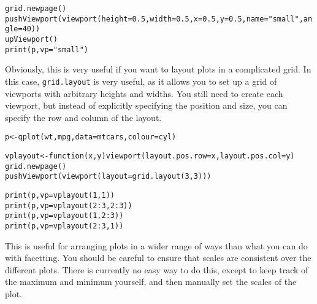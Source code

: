 \begin{alltt}
grid.newpage()
pushViewport(viewport(height=0.5, width=0.5, x=0.5, y=0.5, name="small", angle=40))
upViewport()
print(p, vp="small")
\end{alltt}

Obviously, this is very useful if you want to layout plots in a complicated grid.  In this case, {\tt grid.layout} is very useful, as it allows you to set up a grid of viewports with arbitrary heights and widths.  You still need to create each viewport, but instead of explicitly specifying the position and size, you can specify the row and column of the layout.

\begin{alltt}
p <- qplot(wt, mpg, data=mtcars, colour=cyl)

vplayout <- function(x, y) viewport(layout.pos.row=x, layout.pos.col=y)
grid.newpage()
pushViewport(viewport(layout=grid.layout(3,3)))

print(p, vp=vplayout(1,1))
print(p, vp=vplayout(2:3,2:3))
print(p, vp=vplayout(1, 2:3))
print(p, vp=vplayout(2:3, 1))
\end{alltt}

This is useful for arranging plots in a wider range of ways than what you can do with facetting.   You should be careful to ensure that scales are consistent over the different plots.  There is currently no easy way to do this, except to keep track of the maximum and minimum yourself, and then manually set the scales of the plot.




